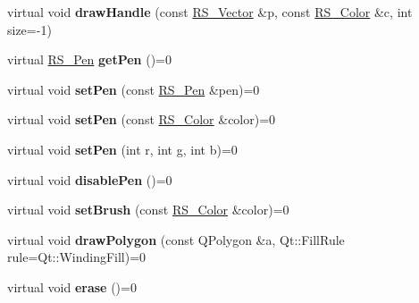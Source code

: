 \begin{DoxyCompactItemize}
\item 
\hypertarget{classRS__Painter_a5d5c876e02a006efc890862de4cf2025}{virtual void {\bfseries draw\-Handle} (const \hyperlink{classRS__Vector}{R\-S\-\_\-\-Vector} \&p, const \hyperlink{classRS__Color}{R\-S\-\_\-\-Color} \&c, int size=-\/1)}\label{classRS__Painter_a5d5c876e02a006efc890862de4cf2025}

\item 
\hypertarget{classRS__Painter_ab789e764edcc03f58bf88a2a4fd535c6}{virtual \hyperlink{classRS__Pen}{R\-S\-\_\-\-Pen} {\bfseries get\-Pen} ()=0}\label{classRS__Painter_ab789e764edcc03f58bf88a2a4fd535c6}

\item 
\hypertarget{classRS__Painter_a7243ff417964960d70b2a7a1b78eeba6}{virtual void {\bfseries set\-Pen} (const \hyperlink{classRS__Pen}{R\-S\-\_\-\-Pen} \&pen)=0}\label{classRS__Painter_a7243ff417964960d70b2a7a1b78eeba6}

\item 
\hypertarget{classRS__Painter_ad202d85ad84606967256199bf0629caa}{virtual void {\bfseries set\-Pen} (const \hyperlink{classRS__Color}{R\-S\-\_\-\-Color} \&color)=0}\label{classRS__Painter_ad202d85ad84606967256199bf0629caa}

\item 
\hypertarget{classRS__Painter_af999be920b11dfc315a1be4675c7d272}{virtual void {\bfseries set\-Pen} (int r, int g, int b)=0}\label{classRS__Painter_af999be920b11dfc315a1be4675c7d272}

\item 
\hypertarget{classRS__Painter_accd93682a92bc8712dd51f336600ae0e}{virtual void {\bfseries disable\-Pen} ()=0}\label{classRS__Painter_accd93682a92bc8712dd51f336600ae0e}

\item 
\hypertarget{classRS__Painter_ac4444181905e299736670e09b0425678}{virtual void {\bfseries set\-Brush} (const \hyperlink{classRS__Color}{R\-S\-\_\-\-Color} \&color)=0}\label{classRS__Painter_ac4444181905e299736670e09b0425678}

\item 
\hypertarget{classRS__Painter_ad3a2754dd29330ec0928434903b08aec}{virtual void {\bfseries draw\-Polygon} (const Q\-Polygon \&a, Qt\-::\-Fill\-Rule rule=Qt\-::\-Winding\-Fill)=0}\label{classRS__Painter_ad3a2754dd29330ec0928434903b08aec}

\item 
\hypertarget{classRS__Painter_ae9014f4f86afde3f8b0381bdbea7145d}{virtual void {\bfseries erase} ()=0}\label{classRS__Painter_ae9014f4f86afde3f8b0381bdbea7145d}


\end{DoxyCompactItemize}
